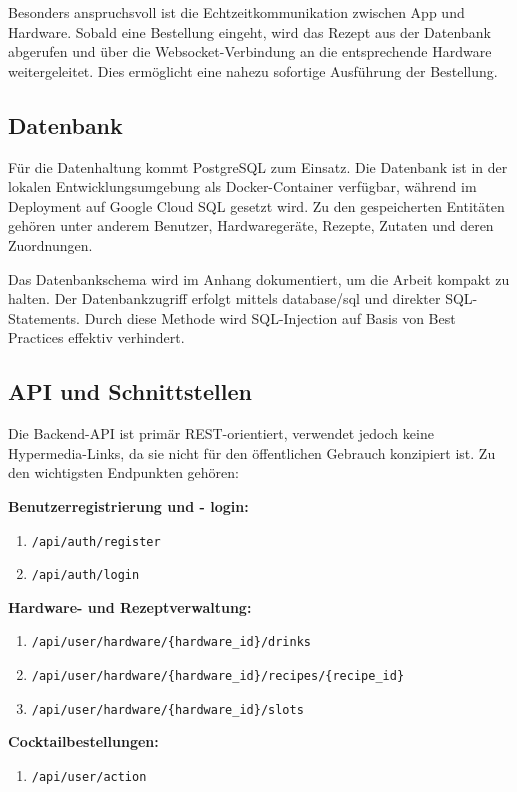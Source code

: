 Besonders anspruchsvoll ist die Echtzeitkommunikation zwischen App und Hardware. Sobald eine 
Bestellung eingeht, wird das Rezept aus der Datenbank abgerufen und über die Websocket-Verbindung 
an die entsprechende Hardware weitergeleitet. Dies ermöglicht eine nahezu sofortige Ausführung der 
Bestellung.

\subsection{Datenbank}

Für die Datenhaltung kommt PostgreSQL zum Einsatz. Die Datenbank ist in der lokalen 
Entwicklungsumgebung als Docker-Container verfügbar, während im Deployment auf Google Cloud SQL 
gesetzt wird. Zu den gespeicherten Entitäten gehören unter anderem Benutzer, Hardwaregeräte, 
Rezepte, Zutaten und deren Zuordnungen.

Das Datenbankschema wird im Anhang dokumentiert, um die Arbeit kompakt zu halten. Der 
Datenbankzugriff erfolgt mittels database/sql und direkter SQL-Statements. Durch diese Methode 
wird SQL-Injection auf Basis von Best Practices effektiv verhindert.

\subsection{API und 
Schnittstellen}

Die Backend-API ist primär REST-orientiert, verwendet jedoch keine Hypermedia-Links, da sie nicht 
für den öffentlichen Gebrauch konzipiert ist. Zu den wichtigsten Endpunkten gehören:

\textbf{Benutzerregistrierung und - login:}
\begin{enumerate}
  \item \texttt{/api/auth/register}
  \item \texttt{/api/auth/login}
\end{enumerate}

\textbf{Hardware- und Rezeptverwaltung:}
\begin{enumerate}
	\item \texttt{/api/user/hardware/\{hardware\_id\}/drinks}
	\item \texttt{/api/user/hardware/\{hardware\_id\}/recipes/\{recipe\_id\}}
	\item \texttt{/api/user/hardware/\{hardware\_id\}/slots}
\end{enumerate}

\textbf{Cocktailbestellungen:}
\begin{enumerate}
  \item \texttt{/api/user/action}
\end{enumerate}

